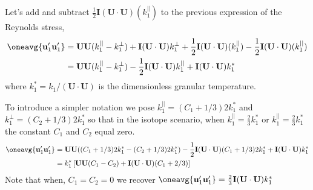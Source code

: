 Let's add and subtract $\frac{1}{2}\textbf{I}(\textbf{U}\cdot\textbf{U})(k^{||}_1)$ to the previous expression of the Reynolds stress, 
\begin{align*}
    \oneavg{\textbf{u}_1'\textbf{u}_1'}
    &= 
    \textbf{U}
    \textbf{U}
    (k^{||}_1 - k^{\bot}_1)
    + \textbf{I} 
    (\textbf{U}\cdot\textbf{U}) k^\bot_1
    + \frac{1}{2}\textbf{I} 
    (\textbf{U}\cdot\textbf{U}) (k^{||}_1)
    - \frac{1}{2}\textbf{I} 
    (\textbf{U}\cdot\textbf{U}) (k^{||}_1)\\
    &= 
    \textbf{U}
    \textbf{U}
    (k^{||}_1 - k^{\bot}_1)
    - \frac{1}{2}\textbf{I} 
    (\textbf{U}\cdot\textbf{U}) k^{||}_1
    + \textbf{I} 
    (\textbf{U}\cdot\textbf{U}) k^*_1
    \\
\end{align*}
where $ k^*_1 = k_1 /(\textbf{U}\cdot \textbf{U})$ is the dimensionless granular temperature.  

To introduce a simpler notation we pose $k^{||}_1 = (C_1 +1/3) 2k_1^*$ and $k^{\bot}_1 = (C_2+1/3) 2k_1^*$ so that in the isotope scenario,  when $k^{||}_1 = \frac{2}{3} k^*_1$ or $k^{||}_1 =\frac{2}{3} k^*_1$ the constant $C_1$ and $C_2$ equal zero. 
\begin{align*}
    \oneavg{\textbf{u}_1'\textbf{u}_1'}
    &= 
    \textbf{U}
    \textbf{U}
    ((C_1 +1/3)2k_1^* -( C_2+1/3) 2 k_1^*)
    - \frac{1}{2}\textbf{I} 
    (\textbf{U}\cdot\textbf{U})  (C_1+1/3) 2k_1^*
    + \textbf{I} 
    (\textbf{U}\cdot\textbf{U}) k^*_1\\
    &= k^*_1 \left[
        \textbf{U}
        \textbf{U}
        (C_1  - C_2 )
        + \textbf{I} 
        (\textbf{U}\cdot\textbf{U})  (C_1+2/3) 
    \right]
\end{align*}
Note that when, $C_1=C_2= 0$ we recover $\oneavg{\textbf{u}_1'\textbf{u}_1'}=\frac{2}{3} \textbf{I}(\textbf{U}\cdot \textbf{U}) k^*_1$

